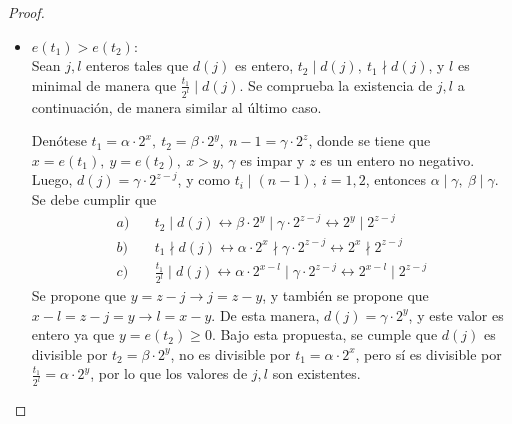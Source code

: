 \documentclass[hidelinks, 12pt]{article}
\newcommand{\Zs}{\mathbb{Z}^*}
\newcommand{\ra}{\rightarrow}
\newcommand{\llra}{\longleftrightarrow}
\begin{document}
\begin{proof}
\begin{itemize}
        Tomando un par $s_1\in\Zs_{q_1},~s_2\in\Zs_{q_2}$ donde $s_i\equiv_{q_i}a_i^{r_i}\equiv_{q_i}a_i^{h_im_i},~i=1,2$, se tiene que como $1\leq r_i\leq\phi(q_i)$, entonces $h_i$ puede tomar los valores
        \[h_i=1,\dots,\frac{\phi(q_i)}{m_i}=t_i\]
        Y como $t_i$ es par, el $h_i$ asociado a $s_i$ puede ser par o impar con la misma frecuencia. Esto implica que las cuatro opciones para la paridad que puede tomar los números $h_1,h_2$ asociados a $s_1,s_2$ (par-par, par-impar, impar-par, impar-impar) ocurre cada una con la misma frecuencia. Como se observó anteriormente, por el lema \ref{le:4.1} se tiene que la cantidad de $b\in\Zs_n$ tales que $b\bmod(q_1,q_2)=(s_1,s_2)$ es la misma para todos los posibles pares $s_1\in\Zs_{q_1},~s_2\in\Zs_{q_2}$, y esto a su vez conlleva que, para los $s_i$ vinculados a exponentes $r_i=h_im_i$, la cantidad de $b\in\Zs_n$ asociados a cada par $r_1,r_2$ es la misma. Como para la mitad de estos pares $r_1,r_2$ se tiene que un $h_i$ es par mientras que el otro es impar, entonces para la mitad de los $b\in\Zs_n$ asociados a estos exponentes se puede asegurar que satisfacen $W_n(b)$.

        Se estableció anteriormente que la cantidad de $b\in\Zs_n$ asociados a $r_i$ múltiplos de $m_i$ es $\frac{\phi(n)}{m_1m_2}$, y como la mitad de estos satisfacen la condición $(ii)(b)$, se concluye que de $\frac{\phi(n)}{2m_1m_2}$ de los $b\in\Zs_n$ no se puede afirmar que $W_n(b)$ sea verdadero, y por lo tanto a lo más $\frac{\phi(n)}{2m_1m_2}$ de los $b\in\Zs_n$ no satisfacen $W_n(b)$.

        \item $e(t_1)>e(t_2)$: \\
        Sean $j,l$ enteros tales que $d(j)$ es entero, $t_2\mid d(j),~t_1\nmid d(j)$, y $l$ es minimal de manera que $\frac{t_1}{2^l}\mid d(j)$. Se comprueba la existencia de $j,l$ a continuación, de manera similar al último caso.
        
        Denótese $t_1=\alpha\cdot 2^x,~t_2=\beta\cdot 2^y,~n-1=\gamma\cdot 2^z$, donde se tiene que $x=e(t_1),~y=e(t_2),~x>y$, $\gamma$ es impar y $z$ es un entero no negativo. Luego, $d(j)=\gamma\cdot 2^{z-j}$, y como $t_i\mid(n-1),~i=1,2$, entonces $\alpha\mid\gamma,~\beta\mid\gamma$. Se debe cumplir que
        \begin{align*}
            a)\quad&t_2\mid d(j)\llra\beta\cdot 2^y\mid\gamma\cdot 2^{z-j}\llra 2^y\mid 2^{z-j} \\
            b)\quad&t_1\nmid d(j)\llra\alpha\cdot 2^x\nmid\gamma\cdot 2^{z-j}\llra 2^x\nmid 2^{z-j} \\
            c)\quad&\frac{t_1}{2^l}\mid d(j)\llra\alpha\cdot 2^{x-l}\mid\gamma\cdot 2^{z-j}\llra 2^{x-l}\mid 2^{z-j}
        \end{align*}
        Se propone que $y=z-j\ra j=z-y$, y también se propone que $x-l=z-j=y\ra l=x-y$. De esta manera, $d(j)=\gamma\cdot 2^y$, y este valor es entero ya que $y=e(t_2)\geq 0$. Bajo esta propuesta, se cumple que $d(j)$ es divisible por $t_2=\beta\cdot 2^y$, no es divisible por $t_1=\alpha\cdot 2^x$, pero sí es divisible por $\frac{t_1}{2^l}=\alpha\cdot 2^y$, por lo que los valores de $j,l$ son existentes.


\end{itemize}
\end{proof}
\end{document}
